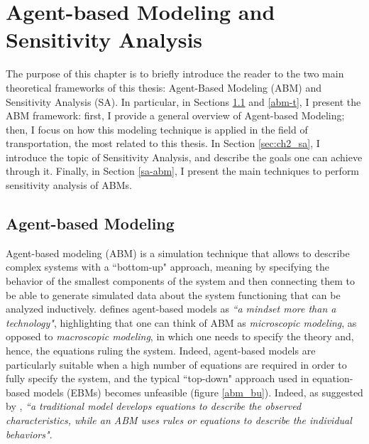 \chapter{Agent-based Modeling and Sensitivity Analysis} \label{ch:literature}

The purpose of this chapter is to briefly introduce the reader to the two main theoretical frameworks of this thesis: Agent-Based Modeling (ABM) and Sensitivity Analysis (SA). In particular, in Sections \ref{abm} and \ref{abm-t}, I present the ABM framework: first, I provide a general overview of Agent-based Modeling; then, I focus on how this modeling technique is applied in the field of transportation, the most related to this thesis. In Section \ref{sec:ch2_sa}, I introduce the topic of Sensitivity Analysis, and describe the goals one can achieve through it. Finally, in Section \ref{sa-abm}, I present the main techniques to perform sensitivity analysis of ABMs.  


\section{Agent-based Modeling}\label{abm}

Agent-based modeling (ABM) is a simulation technique that allows to describe complex systems with a ``bottom-up" approach, meaning by specifying the behavior of the smallest components of the system and then connecting them to be able to generate simulated data about the system functioning that can be analyzed inductively. \textcite{bonabeau2002} defines agent-based models as \textit{``a mindset more than a technology"}, highlighting that one can think of ABM as \textit{microscopic modeling}, as opposed to \textit{macroscopic modeling}, in which one needs to specify the theory and, hence, the equations ruling the system. Indeed, agent-based models are particularly suitable when a high number of equations are required in order to fully specify the system, and the typical ``top-down" approach used in equation-based models (EBMs) becomes unfeasible (figure \ref{abm_bu}). Indeed, as suggested by \textcite{Walton2007ArtificialII}, \textit{``a traditional model develops equations to describe the observed characteristics, while an ABM uses rules or equations to describe the individual behaviors"}. 

